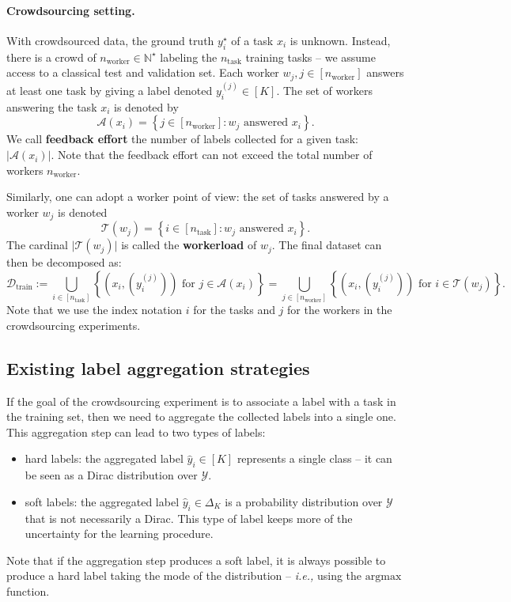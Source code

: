 \paragraph*{Crowdsourcing setting.}
With crowdsourced data, the ground truth $y_i^\star$ of a task $x_i$ is unknown.
Instead, there is a crowd of $n_{\text{worker}}\in \mathbb{N}^\star$ labeling the $n_\text{task}$ training tasks -- we assume access to a classical test and validation set.
Each worker $w_j,j\in [n_{\text{worker}}]$ answers at least one task by giving a label denoted $y_i^{(j)}\in[K]$.
The set of workers answering the task $x_i$ is denoted by
\begin{equation}\label{eq:feedback}
\mathcal{A}(x_i)=\left\{j\in[n_\text{worker}]: w_j \text{ answered }x_i\right\}.
\end{equation}
We call \textbf{feedback effort} the number of labels collected for a given task: $|\mathcal{A}(x_i)|$.
Note that the feedback effort can not exceed the total number of workers $n_{\text{worker}}$.

Similarly, one can adopt a worker point of view: the set of tasks answered by a worker $w_j$ is denoted
\begin{equation}\label{eq:workerload}
\mathcal{T}(w_j)=\left\{i\in[n_\text{task}]: w_j \text{ answered } x_i\right\}.
\end{equation}
The cardinal $\vert \mathcal{T}(w_j)\vert$ is called the \textbf{workerload} of $w_j$.
The final dataset can then be decomposed as:
\begin{equation}\label{eq:trainset}
\mathcal{D}_{\text{train}} := \bigcup_{i\in[n_\text{task}]} \left\{(x_i, (y_i^{(j)})) \text{ for }j\in\mathcal{A}(x_i)\right\} = \bigcup_{j\in[n_\text{worker}]} \left\{(x_i, (y_i^{(j)})) \text{ for }i \in\mathcal{T}(w_j)\right\} .
\end{equation}
Note that we use the index notation $i$ for the tasks and $j$ for the workers in the crowdsourcing experiments.

\subsection{Existing label aggregation strategies}
\label{sub:aggregating_votes}



If the goal of the crowdsourcing experiment is to associate a label with a task in the training set, then we need to aggregate the collected labels into a single one.
This aggregation step can lead to two types of labels:
\begin{itemize}
    \item hard labels: the aggregated label $\hat y_i\in [K]$ represents a single class -- it can be seen as a Dirac distribution over $\mathcal{Y}$.
    \item soft labels: the aggregated label $\hat y_i\in\Delta_K$ is a probability distribution over $\mathcal{Y}$ that is not necessarily a Dirac. This type of label keeps more of the uncertainty for the learning procedure.
\end{itemize}
Note that if the aggregation step produces a soft label, it is always possible to produce a hard label taking the mode of the distribution -- \emph{i.e.,} using the $\mathrm{argmax}$ function.

